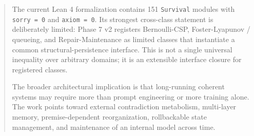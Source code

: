 \documentclass[11pt,a4paper]{article}
\begin{document}
\begin{abstract}
The current Lean 4 formalization contains 151 \texttt{Survival} modules with \texttt{sorry = 0} and \texttt{axiom = 0}. Its strongest cross-class statement is deliberately limited: Phase 7 v2 registers Bernoulli-CSP, Foster-Lyapunov / queueing, and Repair-Maintenance as limited classes that instantiate a common structural-persistence interface. This is not a single universal inequality over arbitrary domains; it is an extensible interface closure for registered classes.

The broader architectural implication is that long-running coherent systems may require more than prompt engineering or more training alone. The work points toward external contradiction metabolism, multi-layer memory, premise-dependent reorganization, rollbackable state management, and maintenance of an internal model across time.
\end{abstract}
\end{document}
